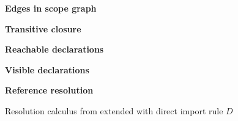\begin{figure}[t]
\bigskip
\begin{boxedminipage}{\hsize}
\textbf{Edges in scope graph}
\smallskip


\medskip


\medskip


\medskip

\textbf{Transitive closure}

       

\medskip


\smallskip

\textbf{Reachable declarations}
\medskip


\medskip  

\textbf{Visible declarations}
\medskip


\medskip

\textbf{Reference resolution}

\medskip 

\end{boxedminipage}
\caption{Resolution calculus from \cite{NeronTVW-ESOP-2015} extended with direct import rule $D$}



\end{figure}

